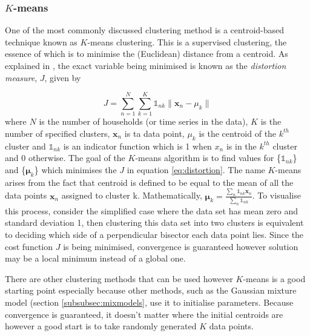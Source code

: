 \documentclass[a4paper]{article}
\begin{document}
\subsubsection{$K$-means}\label{subsubsec:kmeans}
One of the most commonly discussed clustering method is a centroid-based technique known as $K$-means clustering. This is a supervised clustering, the essence of which is to minimise the (Euclidean) distance from a centroid. As explained in \citet{bishop}, the exact variable being minimised is known as the \textit{distortion measure}, $J$, given by

\begin{equation} \label{eq:distortion}
J =\sum_{n=1}^{N} \sum_{k=1}^{K} \mathbb{1}_{nk} \| \textbf{x}_n - \textbf{$\mu$}_k \|
\end{equation}
where $N$ is the number of households (or time series in the data), $K$ is the number of specified clusters, $\textbf{x}_n$ is ta data point, $\mu_k$ is the centroid of the $k^{th}$ cluster and $\mathbb{1}_{nk}$ is an indicator function which is 1 when $x_n$ is in the $k^{th}$ cluster and 0 otherwise. The goal of the $K$-means algorithm is to find values for \{$\mathbb{1}_{nk}$\} and \{$\boldsymbol \mu_k$\} which minimises the $J$ in equation \ref{eq:distortion}. The name $K$-means arises from the fact that centroid is defined to be equal to the mean of all the data points $\textbf{x}_n$ assigned to cluster k. Mathematically, $ \boldsymbol \mu_k = \frac{\sum_n \mathbb{1}_{nk} \textbf{x}_n}{\sum_n \mathbb{1}_{nk}}$. To visualise this process, consider the simplified case where the data set has mean zero and standard deviation 1, then clustering this data set into two clusters is equivalent to deciding which side of a perpendicular bisector each data point lies. Since the cost function $J$ is being minimised, convergence is guaranteed however solution may be a local minimum instead of a global one.

There are other clustering methods that can be used however $K$-means is a good starting point especially because other methods, such as the Gaussian mixture model (section \ref{subsubsec:mixmodels}, use it to initialise parameters. Because convergence is guaranteed, it doesn't matter where the initial centroids are however a good start is to take randomly generated $K$ data points.

\end{document}
